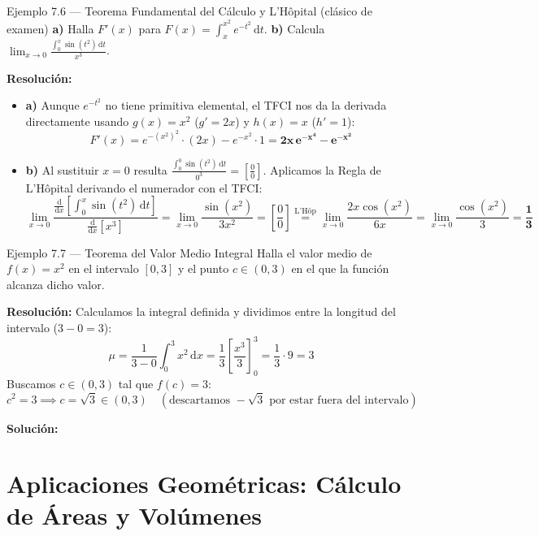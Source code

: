 \documentclass[10pt,a4paper]{article}
\newcommand{\sol}[1]{\par\smallskip\noindent\textbf{Solución:} \fcolorbox{mainblue}{softblue}{$\displaystyle #1$}}
\begin{document}
\begin{ejemplobox}{Ejemplo 7.6 --- Teorema Fundamental del Cálculo y L'Hôpital (clásico de examen)}
\textbf{a)} Halla $F'(x)$ para $\displaystyle F(x) = \int_x^{x^2} e^{-t^2}\,\mathrm{d}t$. \qquad \textbf{b)} Calcula $\displaystyle \lim_{x \to 0} \frac{\int_0^x \sin(t^2)\,\mathrm{d}t}{x^3}$.
\par\textbf{Resolución:}
\begin{itemize}\itemsep 3pt
  \item \textbf{a)} Aunque $e^{-t^2}$ no tiene primitiva elemental, el TFCI nos da la derivada directamente usando $g(x) = x^2$ ($g'=2x$) y $h(x) = x$ ($h'=1$):
  $$F'(x) = e^{-(x^2)^2}\cdot(2x) - e^{-x^2}\cdot 1 = \mathbf{2x\,e^{-x^4} - e^{-x^2}}$$

  \item \textbf{b)} Al sustituir $x = 0$ resulta $\frac{\int_0^0 \sin(t^2)\,\mathrm{d}t}{0^3} = \left[\frac{0}{0}\right]$. Aplicamos la Regla de L'Hôpital derivando el numerador con el TFCI:
  $$\lim_{x \to 0} \frac{\frac{\mathrm{d}}{\mathrm{d}x}\left[\int_0^x \sin(t^2)\,\mathrm{d}t\right]}{\frac{\mathrm{d}}{\mathrm{d}x}[x^3]} = \lim_{x \to 0} \frac{\sin(x^2)}{3x^2} = \left[\frac{0}{0}\right] \stackrel{\text{L'Hôp}}{=} \lim_{x \to 0} \frac{2x\cos(x^2)}{6x} = \lim_{x \to 0} \frac{\cos(x^2)}{3} = \mathbf{\frac{1}{3}}$$
\end{itemize}
\end{ejemplobox}

\begin{ejemplobox}{Ejemplo 7.7 --- Teorema del Valor Medio Integral}
Halla el valor medio de $f(x) = x^2$ en el intervalo $[0, 3]$ y el punto $c \in (0, 3)$ en el que la función alcanza dicho valor.
\par\textbf{Resolución:} Calculamos la integral definida y dividimos entre la longitud del intervalo ($3 - 0 = 3$):
$$\mu = \frac{1}{3 - 0}\int_0^3 x^2\,\mathrm{d}x = \frac{1}{3}\left[\frac{x^3}{3}\right]_0^3 = \frac{1}{3}\cdot 9 = 3$$
Buscamos $c \in (0, 3)$ tal que $f(c) = 3$:
$$c^2 = 3 \implies c = \sqrt{3} \in (0, 3) \quad (\text{descartamos } -\sqrt{3} \text{ por estar fuera del intervalo})$$
\sol{\mu = 3, \quad c = \sqrt{3}}
\end{ejemplobox}

\newpage

\section{Aplicaciones Geométricas: Cálculo de Áreas y Volúmenes}
\end{document}
